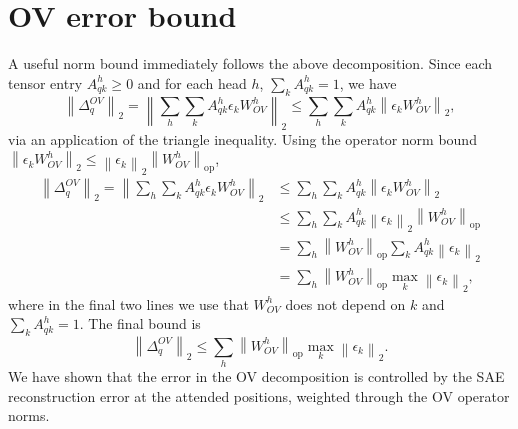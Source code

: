\documentclass[10pt]{article}
\theoremstyle{definition}
\newcommand{\1}{\mathbf{1}}
\newcommand{\tnorm}[1]{\left\lVert #1 \right\rVert_2}
\newcommand{\opnorm}[1]{\left\lVert #1 \right\rVert_{\mathrm{op}}}
\begin{document}
\section{OV error bound}
A useful norm bound immediately follows the above decomposition. Since each tensor entry $A_{qk}^h \geq 0$ and for each head $h$,  $\sum_k A_{qk}^h = 1$, we have
\[
\tnorm{\Delta_q^{OV}} = \tnorm{\sum_h \sum_k A_{qk}^h \epsilon_k W_{OV}^h} \leq \sum_h \sum_k A_{qk}^h \tnorm{\epsilon_k W_{OV}^h},
\]
via an application of the triangle inequality. Using the operator norm bound $\tnorm{\epsilon_k W_{OV}^h} \leq \tnorm{\epsilon_k}\opnorm{W_{OV}^h}$,
\begin{align}
\tnorm{\Delta_q^{OV}} = \tnorm{\sum_h \sum_k A_{qk}^h \epsilon_k W_{OV}^h} &\leq \sum_h \sum_k A_{qk}^h \tnorm{\epsilon_k W_{OV}^h} \\
&\leq \sum_h \sum_k A_{qk}^h \tnorm{\epsilon_k}\opnorm{W_{OV}^h} \\
&= \sum_h \opnorm{W_{OV}^h} \sum_k A_{qk}^h \tnorm{\epsilon_k} \\
&= \sum_h \opnorm{W_{OV}^h} \max_k \tnorm{\epsilon_k},
\end{align}
where in the final two lines we use that $W_{OV}^h$ does not depend on $k$ and $\sum_k A_{qk}^h = 1$. The final bound is
\begin{equation}
  \tnorm{\Delta_q^{OV}} \leq  \sum_h \opnorm{W_{OV}^h} \max_k \tnorm{\epsilon_k}.
\end{equation}
We have shown that the error in the OV decomposition is controlled by the SAE reconstruction error at the attended positions, weighted through the OV operator norms.
\end{document}
